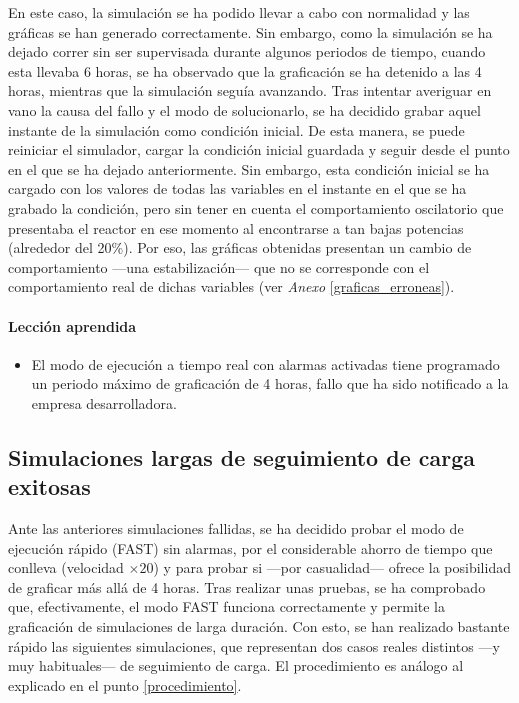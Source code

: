 En este caso, la simulación se ha podido llevar a cabo con normalidad y las gráficas se han generado correctamente. Sin embargo, como la simulación se ha dejado correr sin ser supervisada durante algunos periodos de tiempo, cuando esta llevaba 6 horas, se ha observado que la graficación se ha detenido a las 4 horas, mientras que la simulación seguía avanzando. Tras intentar averiguar en vano la causa del fallo y el modo de solucionarlo, se ha decidido grabar aquel instante de la simulación como condición inicial. De esta manera, se puede reiniciar el simulador, cargar la condición inicial guardada y seguir desde el punto en el que se ha dejado anteriormente. Sin embargo, esta condición inicial se ha cargado con los valores de todas las variables en el instante en el que se ha grabado la condición, pero sin tener en cuenta el comportamiento oscilatorio que presentaba el reactor en ese momento al encontrarse a tan bajas potencias (alrededor del 20\%). Por eso, las gráficas obtenidas presentan un cambio de comportamiento ---una estabilización--- que no se corresponde con el comportamiento real de dichas variables (ver \textit{Anexo} \ref{graficas_erroneas}).

\paragraph{Lección aprendida}

\begin{itemize}
  \item El modo de ejecución a tiempo real con alarmas activadas tiene programado un periodo máximo de graficación de 4 horas, fallo que ha sido notificado a la empresa desarrolladora.
\end{itemize}

\newpage
\subsection{Simulaciones largas de seguimiento de carga exitosas}

Ante las anteriores simulaciones fallidas, se ha decidido probar el modo de ejecución rápido (FAST) sin alarmas, por el considerable ahorro de tiempo que conlleva (velocidad $\times 20$) y para probar si ---por casualidad--- ofrece la posibilidad de graficar más allá de 4 horas. Tras realizar unas pruebas, se ha comprobado que, efectivamente, el modo FAST funciona correctamente y permite la graficación de simulaciones de larga duración. Con esto, se han realizado bastante rápido las siguientes simulaciones, que representan dos casos reales distintos ---y muy habituales--- de seguimiento de carga. El procedimiento es análogo al explicado en el punto \ref{procedimiento}.

